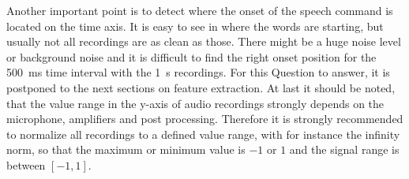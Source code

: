 Another important point is to detect where the onset of the speech command is located on the time axis. It is easy to see in  where the words are starting, but usually not all recordings are as clean as those.
There might be a huge noise level or background noise and it is difficult to find the right onset position for the \SI{500}{\milli\second} time interval with the \SI{1}{\second} recordings.
For this Question to answer, it is postponed to the next sections on feature extraction.
At last it should be noted, that the value range in the y-axis of audio recordings strongly depends on the microphone, amplifiers and post processing.
Therefore it is strongly recommended to normalize all recordings to a defined value range, with for instance the infinity norm, so that the maximum or minimum value is $-1$ or $1$ and the signal range is between $[-1, 1]$.